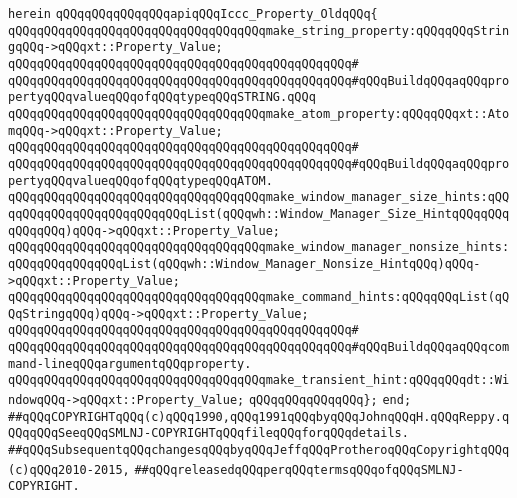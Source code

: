 \verb|herein|\newline
\newline
\verb|qQQqqQQqqQQqqQQqapiqQQqIccc_Property_OldqQQq{|\newline
\newline
\verb|qQQqqQQqqQQqqQQqqQQqqQQqqQQqqQQqqQQqmake_string_property:qQQqqQQqStringqQQq->qQQqxt::Property_Value;|\newline
\verb|qQQqqQQqqQQqqQQqqQQqqQQqqQQqqQQqqQQqqQQqqQQqqQQq#|\newline
\verb|qQQqqQQqqQQqqQQqqQQqqQQqqQQqqQQqqQQqqQQqqQQqqQQq#qQQqBuildqQQqaqQQqpropertyqQQqvalueqQQqofqQQqtypeqQQqSTRING.qQQq|\newline
\newline
\verb|qQQqqQQqqQQqqQQqqQQqqQQqqQQqqQQqqQQqmake_atom_property:qQQqqQQqxt::AtomqQQq->qQQqxt::Property_Value;|\newline
\verb|qQQqqQQqqQQqqQQqqQQqqQQqqQQqqQQqqQQqqQQqqQQqqQQq#|\newline
\verb|qQQqqQQqqQQqqQQqqQQqqQQqqQQqqQQqqQQqqQQqqQQqqQQq#qQQqBuildqQQqaqQQqpropertyqQQqvalueqQQqofqQQqtypeqQQqATOM.|\newline
\newline
\verb|qQQqqQQqqQQqqQQqqQQqqQQqqQQqqQQqqQQqmake_window_manager_size_hints:qQQqqQQqqQQqqQQqqQQqqQQqqQQqList(qQQqwh::Window_Manager_Size_HintqQQqqQQqqQQqqQQq)qQQq->qQQqxt::Property_Value;|\newline
\verb|qQQqqQQqqQQqqQQqqQQqqQQqqQQqqQQqqQQqmake_window_manager_nonsize_hints:qQQqqQQqqQQqqQQqList(qQQqwh::Window_Manager_Nonsize_HintqQQq)qQQq->qQQqxt::Property_Value;|\newline
\newline
\verb|qQQqqQQqqQQqqQQqqQQqqQQqqQQqqQQqqQQqmake_command_hints:qQQqqQQqList(qQQqStringqQQq)qQQq->qQQqxt::Property_Value;|\newline
\verb|qQQqqQQqqQQqqQQqqQQqqQQqqQQqqQQqqQQqqQQqqQQqqQQq#|\newline
\verb|qQQqqQQqqQQqqQQqqQQqqQQqqQQqqQQqqQQqqQQqqQQqqQQq#qQQqBuildqQQqaqQQqcommand-lineqQQqargumentqQQqproperty.|\newline
\newline
\verb|qQQqqQQqqQQqqQQqqQQqqQQqqQQqqQQqqQQqmake_transient_hint:qQQqqQQqdt::WindowqQQq->qQQqxt::Property_Value;|\newline
\verb|qQQqqQQqqQQqqQQq};|\newline
\newline
\verb|end;|\newline
\newline
\newline
\newline
\newline
\newline
\newline
\newline
\verb|##qQQqCOPYRIGHTqQQq(c)qQQq1990,qQQq1991qQQqbyqQQqJohnqQQqH.qQQqReppy.qQQqqQQqSeeqQQqSMLNJ-COPYRIGHTqQQqfileqQQqforqQQqdetails.|\newline
\verb|##qQQqSubsequentqQQqchangesqQQqbyqQQqJeffqQQqProtheroqQQqCopyrightqQQq(c)qQQq2010-2015,|\newline
\verb|##qQQqreleasedqQQqperqQQqtermsqQQqofqQQqSMLNJ-COPYRIGHT.|\newline

